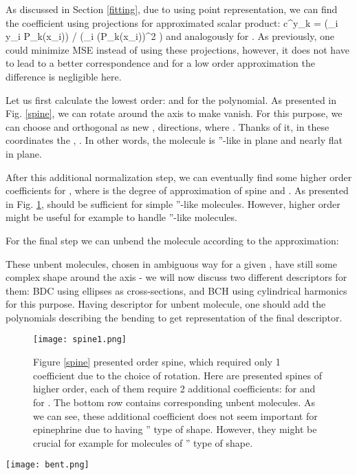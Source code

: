 \documentclass[10pt,journal]{IEEEtranTCOM}
\theoremstyle{plain}
\begin{document}
As discussed in Section \ref{fitting}, due to using point representation, we can find the coefficient using projections for  approximated scalar product:
\be c^y_k = \left(\sum_i y_i P_k(x_i)\right) / \left(\sum_i (P_k(x_i))^2 \right)\ee
and analogously for . As previously, one could minimize MSE instead of using these projections, however, it does not have to lead to a better correspondence and for a low order approximation the difference is negligible here.

Let us first calculate the lowest order:  and  for the  polynomial. As presented in Fig. \ref{spine}, we can rotate around the  axis to make  vanish. For this purpose, we can choose  and orthogonal  as new ,  directions, where . Thanks of it, in these coordinates the , . In other words, the molecule is ''-like in  plane and nearly flat in  plane.

After this additional normalization step, we can eventually find some higher order coefficients  for , where  is the degree of approximation of spine and . As presented in Fig. \ref{spine1},  should be sufficient for simple ''-like molecules. However, higher order might be useful for example to handle ''-like molecules.

For the final step we can unbend the molecule according to the approximation:

These unbent molecules, chosen in ambiguous way for a given , have still some complex shape around the  axis - we will now discuss two different descriptors for them: BDC using ellipses as cross-sections, and BCH using cylindrical harmonics for this purpose. Having descriptor for unbent molecule, one should add the polynomials describing the bending to get representation of the final descriptor.

\begin{figure}[t!]
    \centering
        \texttt{[image: spine1.png]}
        \caption{Figure \ref{spine} presented  order spine, which required only 1 coefficient due to the choice of rotation. Here are presented spines of higher order, each of them require 2 additional coefficients: for  and for . The bottom row contains corresponding unbent molecules. As we can see, these additional coefficient does not seem important for epinephrine due to having '' type of shape. However, they might be crucial for example for molecules of '' type of shape.}
        \label{spine1}
\end{figure}
\begin{figure*}[t!]
    \centering
        \texttt{[image: bent.png]}
        \caption{Some bent deformed cylinder (BDC) and bent cylindrical harmonics (BCH) representations of epinephrine for  degree spine (1 additional coefficient describing bending, identical for all 6 cases). The BDC artifact is caused by changing order of eigenvalues (radii). While these representations are intended to close at  and , the  BDC closes earlier due to one radius going below 0. The  BCH are circles in cross-sections.}
        \label{bent}
\end{figure*}
\end{document}
